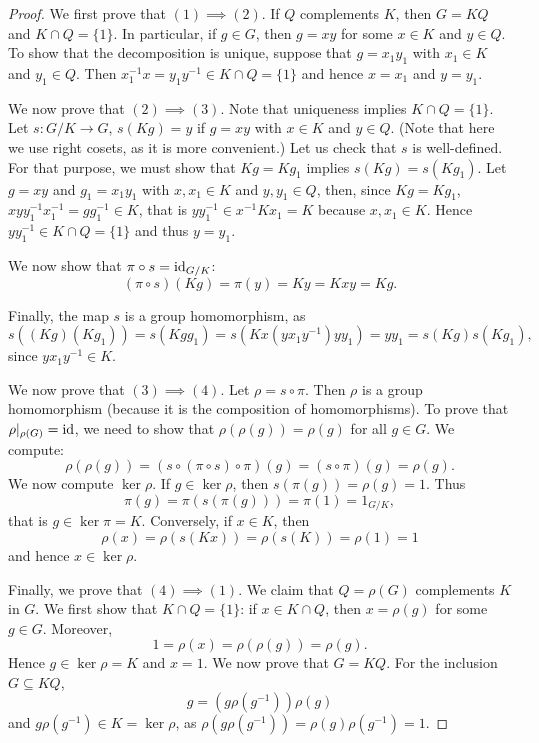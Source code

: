 \begin{proof}
We first prove that $(1)\implies(2)$. If $Q$ complements $K$, then $G=KQ$ and
$K\cap Q=\{1\}$. In particular, if $g\in G$, then $g=xy$ for some $x\in K$ and $y\in Q$. To show that
the decomposition is unique, suppose that 
$g=x_1y_1$ with $x_1\in K$ and $y_1\in Q$. Then $x_1^{-1}x=y_1y^{-1}\in K\cap Q=\{1\}$ 
and hence $x=x_1$ and $y=y_1$.


We now prove that $(2)\implies(3)$. 
Note that uniqueness implies $K\cap Q=\{1\}$.
Let $s\colon G/K\to G$, $s(Kg)=y$ if 
$g=xy$ with $x\in K$ and $y\in Q$. (Note that here we use right cosets, as it is more convenient.)
Let us check that $s$ is well-defined. 
For that purpose, we must show that $Kg=Kg_1$ implies $s(Kg)=s(Kg_1)$. Let $g=xy$ 
and $g_1=x_1y_1$ with $x,x_1\in K$ and $y,y_1\in Q$, then, since $Kg=Kg_1$, 
$xyy_1^{-1}x_1^{-1}=gg_1^{-1}\in K$, that is $yy_1^{-1}\in x^{-1}Kx_1=K$
 because $x,x_1\in K$. Hence $yy_1^{-1}\in K\cap Q=\{1\}$ and thus $y=y_1$. 
 
 We now show that $\pi\circ
 s=\operatorname{id}_{G/K}$:
\[
(\pi\circ s)(Kg)=\pi(y)=Ky=Kxy=Kg.
\]

Finally, the map 
$s$ is a group homomorphism, as 
\[
s((Kg)(Kg_1))=s(Kgg_1)=s(Kx(yx_1y^{-1})yy_1)=yy_1=s(Kg)s(Kg_1),
\]
since $yx_1y^{-1}\in K$. 


We now prove that $(3)\implies(4)$. Let $\rho=s\circ\pi$. Then $\rho$ is a group homomorphism (because it is the composition of homomorphisms). 
To prove that $\rho|_{\rho(G)}=\operatorname{id}$, we need to show that $\rho(\rho(g))=\rho(g)$ for all $g\in G$. 
We compute: 
\[
\rho(\rho(g))=(s\circ(\pi\circ s)\circ\pi)(g)=(s\circ\pi)(g)=\rho(g).
\]
We now compute $\ker\rho$. If $g\in\ker\rho$, then $s(\pi(g))=\rho(g)=1$. Thus 
\[
\pi(g)=\pi(s(\pi(g)))=\pi(1)=1_{G/K},
\]
that is $g\in\ker\pi=K$. Conversely, if $x\in K$, then
\[
\rho(x)=\rho(s(Kx))=\rho(s(K))=\rho(1)=1
\]
and hence $x\in\ker\rho$.

Finally, we prove that $(4)\implies(1)$. We claim that $Q=\rho(G)$ complements $K$ in
 $G$. We first show that $K\cap Q=\{1\}$: if $x\in K\cap Q$, then $x=\rho(g)$ for some $g\in G$. Moreover, 
\[
1=\rho(x)=\rho(\rho(g))=\rho(g).
\]
Hence $g\in\ker\rho=K$ and $x=1$. We now prove that $G=KQ$. For the inclusion $G\subseteq KQ$, 
\[
g=(g\rho(g^{-1}))\rho(g)
\]
and $g\rho(g^{-1})\in K=\ker\rho$, as $\rho(g\rho(g^{-1}))=  \rho(g)\rho(g^{-1})=1$.
\end{proof}

